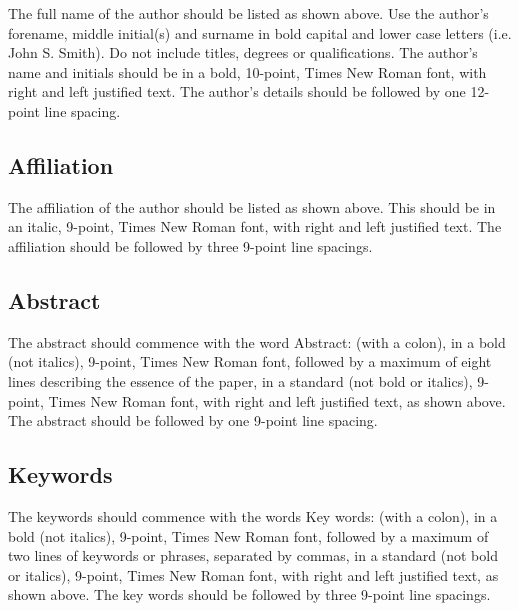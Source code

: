 \documentclass[10pt,twocolumn]{witseiepaper}
\begin{document}
The full name of the author should be listed as shown above. Use the author's
forename, middle initial(s) and surname in bold capital and lower case letters
(i.e. {\msbf John S. Smith}). Do not include titles, degrees or qualifications.
The author's name and initials should be in a bold, 10-point, Times New Roman
font, with right and left justified text. The author's details should be
followed by one 12-point line spacing.

\subsection{Affiliation}

The affiliation of the author should be listed as shown above. This should be
in an italic, 9-point, Times New Roman font, with right and left justified
text. The affiliation should be followed by three 9-point line spacings.

\subsection{Abstract}

The abstract should commence with the word {\msbf Abstract:} (with a colon), in
a bold (not italics), 9-point, Times New Roman font, followed by a maximum of
eight lines describing the essence of the paper, in a standard (not bold or
italics), 9-point, Times New Roman font, with right and left justified text, as
shown above. The abstract should be followed by one 9-point line spacing.

\subsection{Keywords}

The keywords should commence with the words {\msbf Key words:} (with a colon),
in a bold (not italics), 9-point, Times New Roman font, followed by a maximum
of two lines of keywords or phrases, separated by commas, in a standard (not
bold or italics), 9-point, Times New Roman font, with right and left justified
text, as shown above.  The key words should be followed by three 9-point line
spacings.
\end{document}
